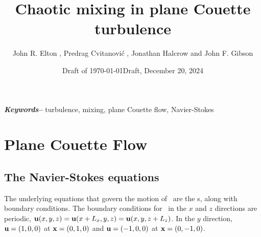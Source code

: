 \documentclass[lineno]{jfm}
\providecommand{\keywords}[1]
{
  \small	
  \textbf{\emph{Keywords--}} #1
}
\begin{document}
        \ifboyscout
\date{{\color{blue}Draft of \today}} %
        \else
\date{Draft, December 20, 2024}
        \fi 

\title{Chaotic mixing in plane Couette turbulence}


\author{John R. Elton
            ,
        Predrag Cvitanovi\'{c}
            ,
        Jonathan Halcrow
    and
        John F. Gibson
        }


\maketitle

\begin{abstract}    %
    
\end{abstract}       %

\keywords{turbulence, mixing, plane Couette flow, Navier-Stokes}

     


\section{Plane Couette Flow}
\label{s:PCF}

\subsection{The Navier-Stokes equations}
\label{s:NS}
 The underlying equations
that govern the motion of \pCf\ are the {\NSe}s,
along with boundary conditions. The boundary conditions for \pCf\ in the $x$
and $z$ directions are periodic,
 $ {\bf u}(x, y, z) = {\bf u}(x+L_x, y, z) =
{\bf u}(x, y, z + L_z) $.
 In the $y$ direction,
 ${\bf u} = (1,0,0)$ at ${\bf x} = (0,1,0)$ and ${\bf u} = (-1,0,0)$ at ${\bf x} =
 (0,-1,0)$.
\end{document}

